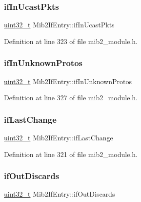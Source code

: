 \subsubsection{\texorpdfstring{if\+In\+Ucast\+Pkts}{ifInUcastPkts}}
{\footnotesize\ttfamily \hyperlink{stdint_8h_a435d1572bf3f880d55459d9805097f62}{uint32\+\_\+t} Mib2\+If\+Entry\+::if\+In\+Ucast\+Pkts}



Definition at line 323 of file mib2\+\_\+module.\+h.

\mbox{\label{structMib2IfEntry_aa8a17af4b37a02711289091c88ad22ff}} 
\subsubsection{\texorpdfstring{if\+In\+Unknown\+Protos}{ifInUnknownProtos}}
{\footnotesize\ttfamily \hyperlink{stdint_8h_a435d1572bf3f880d55459d9805097f62}{uint32\+\_\+t} Mib2\+If\+Entry\+::if\+In\+Unknown\+Protos}



Definition at line 327 of file mib2\+\_\+module.\+h.

\mbox{\label{structMib2IfEntry_a1dfe652178f86a79efee8ae7daf7dcb7}} 
\subsubsection{\texorpdfstring{if\+Last\+Change}{ifLastChange}}
{\footnotesize\ttfamily \hyperlink{stdint_8h_a435d1572bf3f880d55459d9805097f62}{uint32\+\_\+t} Mib2\+If\+Entry\+::if\+Last\+Change}



Definition at line 321 of file mib2\+\_\+module.\+h.

\mbox{\label{structMib2IfEntry_a5deaaa7d6c3bb1aba481f05d5726311d}} 
\subsubsection{\texorpdfstring{if\+Out\+Discards}{ifOutDiscards}}
{\footnotesize\ttfamily \hyperlink{stdint_8h_a435d1572bf3f880d55459d9805097f62}{uint32\+\_\+t} Mib2\+If\+Entry\+::if\+Out\+Discards}



